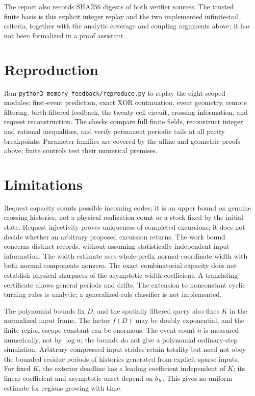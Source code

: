 \documentclass[
  11pt,
]{article}
\begin{document}
The report also records SHA256 digests of both verifier sources. The
trusted finite basis is this explicit integer replay and the two
implemented infinite-tail criteria, together with the analytic coverage
and coupling arguments above; it has not been formalized in a proof
assistant.



\section{Reproduction}\label{reproduction-and-perspective}

Run \texttt{python3\ memory\_feedback/reproduce.py} to replay the eight
scoped modules: first-event prediction, exact XOR continuation, event
geometry, remote filtering, birth-filtered feedback, the twenty-cell circuit, crossing information, and request reconstruction. The checks
compare full finite fields, reconstruct integer and rational
inequalities, and verify permanent periodic tails at all parity
breakpoints. Parameter families are covered by the affine and geometric
proofs above; finite controls test their numerical premises.

\section{Limitations}

Request capacity counts possible incoming codes; it is an upper bound on genuine
crossing histories, not a physical realization count or a stock fixed by the
initial state. Request injectivity proves uniqueness of completed excursions;
it does not decide whether an arbitrary proposed excursion returns. The work
bound concerns distinct records, without assuming statistically independent
input information.
\label{limitations}
The width estimate uses whole-prefix normal-coordinate width with both normal
components nonzero. The exact combinatorial capacity does not establish physical
sharpness of the asymptotic width coefficient. A translating certificate allows
general periods and drifts. The extension to nonconstant cyclic turning rules is
analytic; a generalized-rule classifier is not implemented.


The polynomial bounds fix \(D\), and the spatially filtered query also
fixes \(K\) in the normalized input frame. The factor \(f(D)\) may be
doubly exponential, and the finite-region escape constant can be enormous.
The event count \(n\) is measured numerically, not by \(\log n\);
the bounds do not give a polynomial ordinary-step simulation. Arbitrary
compressed input strides retain totality but need not obey the bounded
residue periods of histories generated from explicit sparse inputs.
For fixed \(K\), the exterior deadline has a leading coefficient
independent of \(K\); its linear coefficient and asymptotic onset depend
on \(b_K\). This gives no uniform estimate for regions growing with time.
\end{document}
